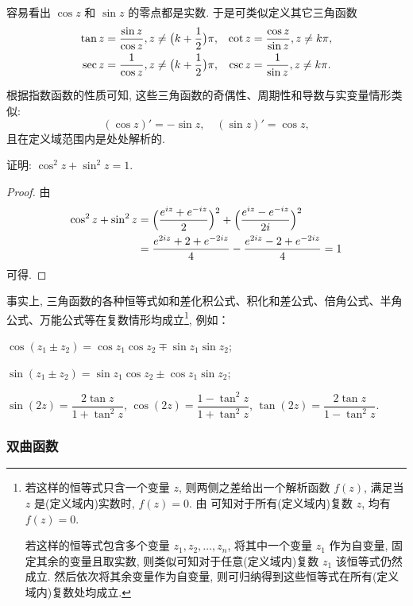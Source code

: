 容易看出 $\cos z$ 和 $\sin z$ 的零点都是实数.
于是可类似定义其它三角函数
\begin{align*}
  \tan z&=\frac{\sin z}{\cos z},z\neq\bigl(k+\frac{1}{2}\bigr)\pi,&
  \cot z&=\frac{\cos z}{\sin z},z\neq k\pi,\\
  \sec z&=\frac{1}{\cos z},z\neq\bigl(k+\frac{1}{2}\bigr)\pi,&
  \csc z&=\frac{1}{\sin z},z\neq k\pi.
\end{align*}

根据指数函数的性质可知, 这些三角函数的奇偶性、周期性和导数与实变量情形类似:
  \[
    (\cos z)'=-\sin z,\quad
    (\sin z)'=\cos z,
  \]
且在定义域范围内是处处解析的.

\begin{example}
  证明: $\cos^2z+\sin^2z=1$.
\end{example}
\begin{proof}
  由
  \begin{align*}
    \cos^2z+\sin^2z&
     =\Bigl(\frac{e^{iz}+e^{-iz}}2\Bigr)^2+\Bigl(\frac{e^{iz}-e^{-iz}}{2i}\Bigr)^2\\
    &=\frac{e^{2iz}+2+e^{-2iz}}4-\frac{e^{2iz}-2+e^{-2iz}}4=1
  \end{align*}
  可得.
\end{proof}

事实上, 三角函数的各种恒等式如和差化积公式、积化和差公式、倍角公式、半角公式、万能公式等在复数情形均成立\footnote{%
  若这样的恒等式只含一个变量 $z$, 则两侧之差给出一个解析函数 $f(z)$, 满足当 $z$ 是(定义域内)实数时, $f(z)=0$.
  由 可知对于所有(定义域内)复数 $z$, 均有 $f(z)=0$.

  若这样的恒等式包含多个变量 $z_1,z_2,\dots,z_n$, 将其中一个变量 $z_1$ 作为自变量, 固定其余的变量且取实数, 则类似可知对于任意(定义域内)复数 $z_1$ 该恒等式仍然成立.
  然后依次将其余变量作为自变量, 则可归纳得到这些恒等式在所有(定义域内)复数处均成立.
}, 例如：

\begin{itempar}
  \item $\cos(z_1\pm z_2)=\cos z_1 \cos z_2\mp \sin z_1 \sin z_2$;
  \item $\sin(z_1\pm z_2)=\sin z_1 \cos z_2\pm\cos z_1 \sin z_2$;
  \item $\sin(2z)=\dfrac{2\tan z}{1+\tan^2 z}$, 
    $\cos(2z)=\dfrac{1-\tan^2 z}{1+\tan^2 z}$, 
    $\tan(2z)=\dfrac{2\tan z}{1-\tan^2 z}$.
\end{itempar}

\subsubsection{双曲函数}

